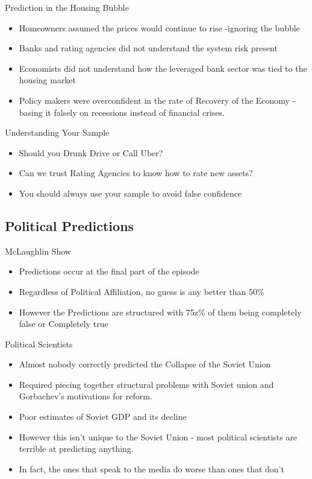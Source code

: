 \documentclass[bigger]{beamer}
\begin{document}
\begin{frame}[label=sec-2-1-3]{Prediction in the Housing Bubble}
\begin{itemize}
\item Homeowners assumed the prices would continue to rise -ignoring the
bubble
\item Banks and rating agencies did not understand the system risk present
\item Economists did not understand how the leveraged bank sector was tied
to the housing market
\item Policy makers were overconfident in the rate of Recovery of the
Economy - basing it falsely on recessions instead of financial
crises.
\end{itemize}
\end{frame}

\begin{frame}[label=sec-2-1-4]{Understanding Your Sample}
\begin{itemize}
\item Should you Drunk Drive or Call Uber?
\item Can we trust Rating Agencies to know how to rate new assets?
\item You should always use your sample to avoid false confidence
\end{itemize}
\end{frame}

\subsection{Political Predictions}
\label{sec-2-2}

\begin{frame}[label=sec-2-2-1]{McLaughlin Show}
\begin{itemize}
\item Predictions occur at the final part of the episode
\item Regardless of Political Affiliation, no guess is any better than 50\%
\item However the Predictions are structured with 75z\% of them being
completely false or Completely true
\end{itemize}
\end{frame}

\begin{frame}[label=sec-2-2-2]{Political Scientists}
\begin{itemize}
\item Almost nobody correctly predicted the Collapse of the Soviet Union
\item Required piecing together structural problems with Soviet union and
Gorbachev's motivations for reform.
\item Poor estimates of Soviet GDP and its decline
\item However this isn't unique to the Soviet Union - most political
scientists are terrible at predicting anything.
\item In fact, the ones that speak to the media do worse than ones that don't
\end{itemize}
\end{frame}
\end{document}
